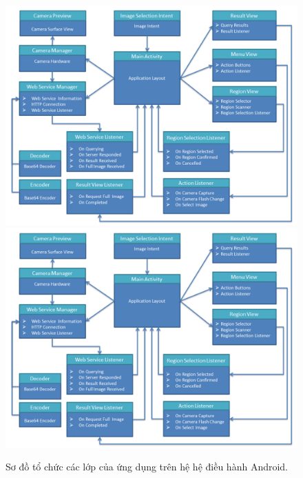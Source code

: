 \begin{figure}[!htbp]
  \begin{center}
    \leavevmode
    \ifpdf
      \includegraphics[scale=0.19]{client_framework}
    \else
      \includegraphics[scale=0.19]{client_framework}
    \fi
    \caption[Sơ đồ tổ chức các lớp của ứng dụng trên hệ hệ điều hành Android.]{Sơ đồ tổ chức các lớp của ứng dụng trên hệ hệ điều hành Android.}
    \label{FigClientFramework}
  \end{center}
\end{figure}


